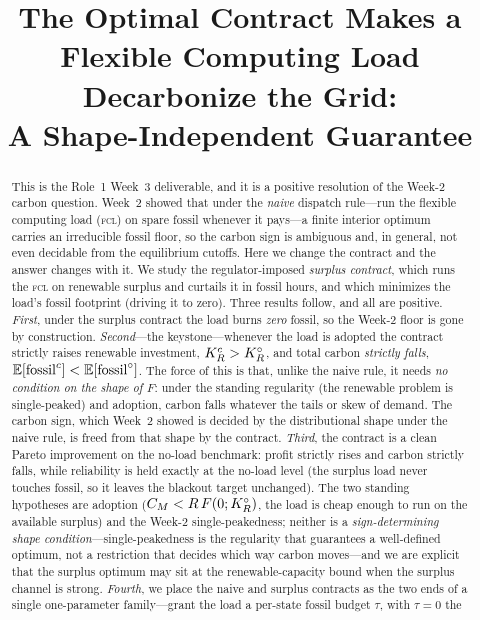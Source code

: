 \title[The Optimal Contract Makes the Flexible Load Decarbonize (Week 3)]
{The Optimal Contract Makes a Flexible Computing Load Decarbonize the Grid:\\
A Shape-Independent Guarantee}



\begin{abstract}
This is the Role~1 Week~3 deliverable, and it is a positive resolution of the Week-2
carbon question. Week~2 showed that under the \emph{naive} dispatch rule---run the
flexible computing load (\textsc{fcl}) on spare fossil whenever it pays---a finite
interior optimum carries an irreducible fossil floor, so the carbon sign is ambiguous
and, in general, not even decidable from the equilibrium cutoffs. Here we change the
contract and the answer changes with it. We study the regulator-imposed
\emph{surplus contract}, which runs the \textsc{fcl} on renewable surplus and
curtails it in fossil hours, and which minimizes the load's fossil footprint
(driving it to zero). Three results follow, and all are positive. \emph{First}, under
the surplus contract the load burns \emph{zero} fossil, so the Week-2 floor is gone by
construction. \emph{Second}---the keystone---whenever the load is adopted the contract
strictly raises renewable investment, $K_R^{c}>K_R^{\circ}$, and total carbon \emph{strictly
falls}, $\mathbb{E}[\mathrm{fossil}^{c}]<\mathbb{E}[\mathrm{fossil}^{\circ}]$. The force of this is that, unlike the
naive rule, it needs \emph{no condition on the shape of $F$}: under the standing
regularity (the renewable problem is single-peaked) and adoption, carbon falls whatever
the tails or skew of demand. The carbon sign, which Week~2 showed is decided by the
distributional shape under the naive rule, is freed from that shape by the contract.
\emph{Third}, the contract is a clean Pareto improvement on the no-load benchmark:
profit strictly rises and carbon strictly falls, while reliability is held exactly at
the no-load level (the surplus load never touches fossil, so it leaves the blackout
target unchanged). The two standing hypotheses are adoption ($C_M<R\,F(0;K_R^{\circ})$, the
load is cheap enough to run on the available surplus) and the Week-2 single-peakedness;
neither is a \emph{sign-determining shape condition}---single-peakedness is the
regularity that guarantees a well-defined optimum, not a restriction that decides which
way carbon moves---and we are explicit that the surplus optimum may sit at the
renewable-capacity bound when the surplus channel is strong. \emph{Fourth}, we place the naive and surplus contracts as the two ends of a single
one-parameter family---grant the load a per-state fossil budget $\tau$, with $\tau=0$ the

\end{abstract}
